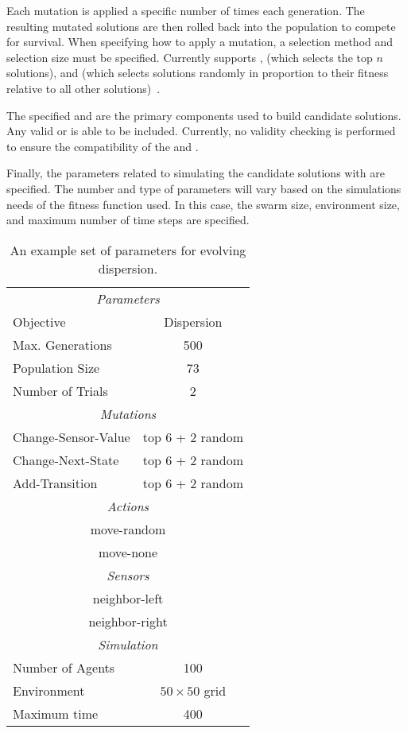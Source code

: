 Each mutation is applied a specific number of times each generation.  The resulting mutated solutions are then rolled back into the population to compete for survival.  When specifying how to apply a mutation, a selection method and selection size must be specified.  Currently \ECS{} supports ,  (which selects the top $n$ solutions), and  (which selects solutions randomly in proportion to their fitness relative to all other solutions)~\cite{back:ec1}.

The specified  and  are the primary components used to build candidate solutions.  Any valid \SWEEP{}  or  is able to be included.  Currently, no validity checking is performed to ensure the compatibility of the  and .

Finally, the parameters related to simulating the candidate solutions with \SWEEP{} are specified.  The number and type of parameters will vary based on the simulations needs of the fitness function used.  In this case, the swarm size, environment size, and maximum number of time steps are specified.  

\begin{table}[ht]
  \centering
  \begin{tabular}{|lc|}
    \hline
    \multicolumn{2}{|c|}{\em{Parameters}} \\
    Objective & Dispersion \\
    Max. Generations & 500 \\
    Population Size & 73 \\
    Number of Trials & 2 \\	
    \hline
    \hline
    \multicolumn{2}{|c|}{\em{Mutations}}   \\
    Change-Sensor-Value & top 6 + 2 random \\
    Change-Next-State   & top 6 + 2 random \\
    Add-Transition      & top 6 + 2 random \\
    \hline
    \hline
    \multicolumn{2}{|c|}{\em{Actions}} \\
    \multicolumn{2}{|c|}{move-random} \\
    \multicolumn{2}{|c|}{move-none} \\
    \hline
    \multicolumn{2}{|c|}{\em{Sensors}} \\
    \multicolumn{2}{|c|}{neighbor-left} \\
    \multicolumn{2}{|c|}{neighbor-right} \\
    \hline
    \hline
    \multicolumn{2}{|c|}{\em{Simulation}} \\
    Number of Agents & 100 \\
    Environment & $50 \times 50$ grid \\
    Maximum time & 400 \\
    \hline 
  \end{tabular}
\caption{An example set of parameters for evolving dispersion.}
\label{tab:ExampleParameters}
\end{table}

